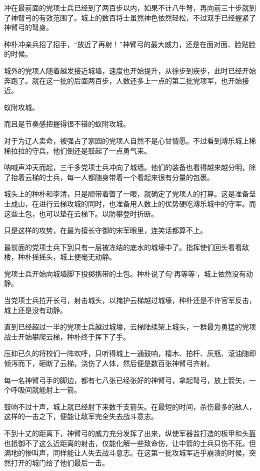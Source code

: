冲在最前面的党项士兵已经到了两百步以内，如果不计八牛弩，再向前三十步就到了神臂弓的有效范围了。城上的数百将士虽然神色依然轻松，不过双手已经握紧了神臂弓的弩身。 

种朴冲亲兵招了招手，“放近了再射！”神臂弓的最大威力，还是在面对面、脸贴脸的时候。 

城外的党项人随着越发接近城墙，速度也开始提升，从徐步到疾步，此时已经开始奔跑了。就在这一批的后面两百步，人数还多上一点的第二批党项军，也开始接近。 

蚁附攻城。 

而且是节奏感把握得很不错的蚁附攻城。 

对于为辽人卖命，被强占了家园的党项人自然不是心甘情愿。不过看到溥乐城上稀稀拉拉的守兵，他们倒还是鼓起了一点勇气来。 

呐喊声冲天而起，三千多党项士兵冲向了城墙。他们的装备也看得越来越分明，除了抬着云梯的士兵，每一人都随身带着一个看起来很有分量的包裹。 

城头上的种朴和李清，只是顺带着瞥了一眼，就确定了党项人的打算。这是准备垒土成山，在进行云梯攻城的同时，也准备用人数上的优势硬吃溥乐城中的守军。而这些土包，也可以垫在云梯下。以防攀登时折断。 

只是这样的攻势，在最为擅长守御的宋军眼里，连笑话都算不上。 

最前面的党项士兵下到只有一层被冻结的底水的城壕中了。指挥使们回头看看敌楼，种朴摇摇头，城上便毫无动静。 

党项士兵开始向城墙脚下投掷携带的土包。种朴说了句‘再等等’，城上依然没有动静。 

当党项士兵拉开长弓，射击城头，以掩护云梯越过城壕，种朴还是不许官军反击，城上还是没有动静。 

直到已经超过一半的党项士兵越过城壕，云梯陆续架上城头，一群最为勇猛的党项战士开始攀爬云梯，种朴终于挥下了手。 

压抑已久的将校们一阵欢呼，只听得城上一通鼓响，檑木、拍杆、灰瓶、滚油随即倾泻而下，砸断了云梯，浇伤了人体，然后便是数百张神臂弓齐射。 

每一名神臂弓手的脚边，都有七八张已经张好的神臂弓，拿起弩弓，放上箭矢，一个呼吸间就能射上一箭。 

鼓响不过十声，城上就已经射下来数千支箭矢。在最短的时间，杀伤最多的敌人，这样的一击之下，便能让敌军完全失去战斗意志。 

不到十丈的距离下，神臂弓的威力充分发挥了出来，纵使军器监打造的板甲和头盔也抵御不了这么近距离的射击，仅能化解一些致命伤，让中箭的士兵只伤不死。但满地的惨叫声，同样能让人失去战斗意志。在这第一批攻城军近乎崩溃的时候，突然打开的城门给了他们最后一击。 

